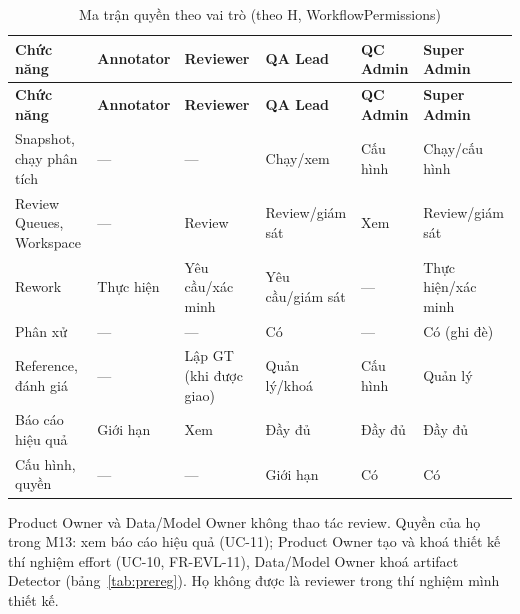 \begin{xltabular}{\linewidth}{@{}L{3.2cm}C{1.8cm}C{1.8cm}C{2cm}C{2cm}C{1.8cm}@{}}
\caption{Ma trận quyền theo vai trò (theo H, WorkflowPermissions)}\label{tab:rbac}\\
\toprule
\textbf{Chức năng} & \textbf{Annotator} & \textbf{Reviewer} & \textbf{QA Lead} & \textbf{QC Admin} & \textbf{Super Admin}\\
\midrule
\endfirsthead
\toprule \textbf{Chức năng} & \textbf{Annotator} & \textbf{Reviewer} & \textbf{QA Lead} & \textbf{QC Admin} & \textbf{Super Admin}\\ \midrule
\endhead
\bottomrule
\endfoot
Snapshot, chạy phân tích & — & — & Chạy/xem & Cấu hình & Chạy/cấu hình\\
Review Queues, Workspace & — & Review & Review/giám sát & Xem & Review/giám sát\\
Rework & Thực hiện & Yêu cầu/xác minh & Yêu cầu/giám sát & — & Thực hiện/xác minh\\
Phân xử & — & — & Có & — & Có (ghi đè)\\
Reference, đánh giá & — & Lập GT (khi được giao) & Quản lý/khoá & Cấu hình & Quản lý\\
Báo cáo hiệu quả & Giới hạn & Xem & Đầy đủ & Đầy đủ & Đầy đủ\\
Cấu hình, quyền & — & — & Giới hạn & Có & Có\\
\end{xltabular}

Product Owner và Data/Model Owner không thao tác review. Quyền của họ trong M13:
xem báo cáo hiệu quả (UC-11); Product Owner tạo và khoá thiết kế thí nghiệm effort
(UC-10, FR-EVL-11), Data/Model Owner khoá artifact Detector (bảng~\ref{tab:prereg}).
Họ không được là reviewer trong thí nghiệm mình thiết kế.

